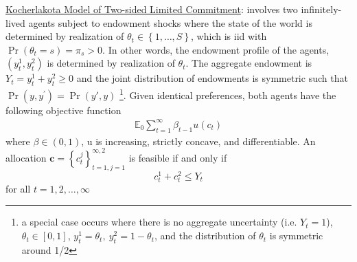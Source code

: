 \documentclass{article}
\begin{document}
\vspace{2.5mm}
\par \underline{Kocherlakota Model of Two-sided Limited Commitment}: involves two infinitely-lived agents subject to endowment shocks where the state of the world is determined by realization of $\theta_{t} \in \left\{ 1, \dots, S \right\}$, which is iid with $\Pr (\theta_{t} = s) = \pi_{s} > 0$. In other words, the endowment profile of the agents, $(y_{t}^{1}, y_{t}^{2})$ is determined by realization of $\theta_{t}$.
The aggregate endowment is $Y_{t} = y_{t}^{1} + y_{t}^{2} \geq 0$ and the joint distribution of endowments is symmetric such that $\Pr(y, y^{'}) = \Pr(y', y)$ \footnote{a special case occurs where there is no aggregate uncertainty (i.e. $Y_{t} = 1$), $\theta_{t} \in [0,1]$, $y_{t}^{1} = \theta_{t}, \ y_{t}^{2} = 1 - \theta_{t}$, and the distribution of $\theta_{t}$ is symmetric around 1/2}.
Given identical preferences, both agents have the following objective function
\begin{gather*}
\mathbb{E}_{0} \sum_{t=1}^{\infty}\beta_{t-1}u(c_{t})
\end{gather*}
where $\beta \in (0,1)$, u is increasing, strictly concave, and differentiable.
An allocation $\textbf{c} = \left\{ c_{t}^{j}\right\}_{t=1, j=1}^{\infty, 2}$ is feasible if and only if $$c_{t}^{1} + c_{t}^{2} \leq Y_{t}$$ for all $t = 1, 2, \dots, \infty$
\end{document}
